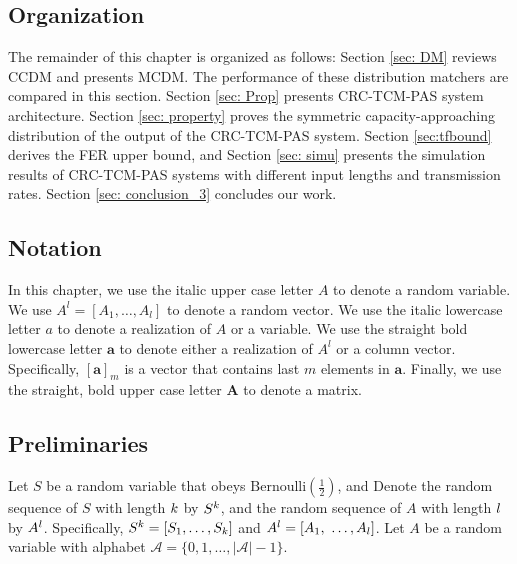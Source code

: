\documentclass [PhD] {uclathes}
\begin{document}
\subsection{Organization}
The remainder of this chapter is organized as follows: Section \ref{sec: DM} reviews CCDM and presents MCDM. 
The performance of these distribution matchers are compared in this section. 
Section  \ref{sec: Prop} presents CRC-TCM-PAS system architecture.  Section \ref{sec: property} proves the symmetric capacity-approaching distribution of the output of the CRC-TCM-PAS system. Section \ref{sec:tfbound} derives the FER upper bound, and Section \ref{sec: simu} presents the simulation results of CRC-TCM-PAS systems with different input lengths and transmission rates. Section  \ref{sec: conclusion_3} concludes our work.
 
\subsection{Notation}
In this chapter, we use the italic upper case letter $A$ to denote a random variable. We use $A^l=[A_1,\ldots,A_l]$ to denote a random vector. 
We use the italic lowercase letter $a$ to denote a realization of $A$ or a variable. 
We use the straight bold lowercase letter $\mathbf{a}$ to denote either a realization of $A^l$ or a column vector. Specifically, $[\mathbf{a}]_m$ is a vector that contains last $m$ elements in $\mathbf{a}$.   
Finally, we use the straight, bold upper case letter $\mathbf{A}$ to denote a matrix.

\subsection{Preliminaries}
Let $S$ be a random variable that obeys $\text{Bernoulli}\left(\frac{1}{2}\right)$, and  Denote the random sequence of $S$ with length $k$ by $S^k$, and the random sequence of $A$ with length $l$ by $A^l$. Specifically, $S^{k}=[S_1,\dots,S_k]$ and $A^{l}=[A_1,\                               \dots,A_l]$. Let $A$ be a random variable with alphabet $\mathcal{A}=\{0,1,\ldots,|\mathcal{A}|-1\}$.
\end{document}

